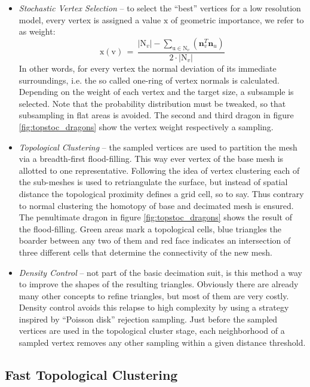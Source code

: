 \begin{itemize}
	\item \textit{Stochastic Vertex Selection} -- to select the ``best'' vertices for a low resolution model, every vertex is assigned a value $\mathrm{x}$ of geometric importance, we refer to as weight: \begin{equation} \label{eq:vertex_weight}
\mathrm{x}(\mathrm{v}) \,=\, \frac{|\mathrm{N}_{v}| - \sum_{\mathrm{u} \in \mathrm{N}_{v} } (\textbf{n}^{T}_{v}\textbf{n}_{u})}{2 \cdot |\mathrm{N}_{v}|}
\end{equation}
In other words, for every vertex the normal deviation of its immediate surroundings, i.e. the so called one-ring of vertex normals is calculated. Depending on the weight of each vertex and the target size, a subsample is selected. Note that the probability distribution must be tweaked, so that subsampling in flat areas is avoided. The second and third dragon in figure \ref{fig:topstoc_dragons} show the vertex weight respectively a sampling.
	\item \textit{Topological Clustering} -- the sampled vertices are used to partition the mesh via a breadth-first flood-filling. This way ever vertex of the base mesh is allotted to one representative. Following the idea of vertex clustering each of the sub-meshes is used to retriangulate the surface, but instead of spatial distance the topological proximity defines a grid cell, so to say. Thus contrary to normal clustering the homotopy of base and decimated mesh is ensured. The penultimate dragon in figure \ref{fig:topstoc_dragons} shows the result of the flood-filling. Green areas mark a topological cells, blue triangles the boarder between any two of them and red face indicates an intersection of three different cells that determine the connectivity of the new mesh.
	\item \textit{Density Control} -- not part of the basic decimation suit, is this method a way to improve the shapes of the resulting triangles. Obviously there are already many other concepts to refine triangles, but most of them are very costly. Density control avoids this relapse to high complexity by using a strategy inspired by ``Poisson disk'' rejection sampling. Just before the sampled vertices are used in the topological cluster stage, each neighborhood of a sampled vertex removes any other sampling within a given distance threshold. 
\end{itemize}


\subsection{Fast Topological Clustering}
\label{topstoc121}


